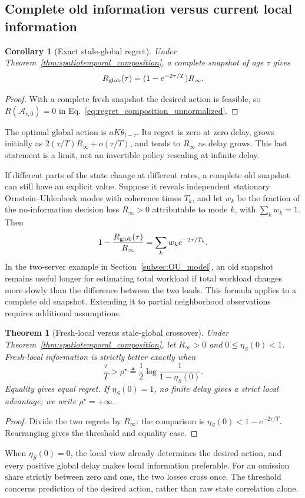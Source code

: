 \documentclass[11pt]{article}
\newtheorem{theorem}{Theorem}
\newtheorem{corollary}{Corollary}
\begin{document}
\subsection{Complete old information versus current local information}
\label{subsec:two_architectures}

\begin{corollary}[Exact stale-global regret]
\label{thm:OU_stale_regret}
Under Theorem~\ref{thm:spatiotemporal_composition}, a complete snapshot of age
$\tau$ gives
\begin{equation}
R_{\rm glob}(\tau)=(1-e^{-2\tau/T})R_\infty.
\label{eq:OU_exact_regret}
\end{equation}
\end{corollary}
\begin{proof}
With a complete fresh snapshot the desired action is feasible, so
$R(\mathcal A_{r,0})=0$ in Eq.~\eqref{eq:regret_composition_unnormalized}.
\end{proof}
The optimal global action is $aK\theta_{t-\tau}$. Its regret is zero at
zero delay, grows initially as $2(\tau/T)R_\infty+o(\tau/T)$, and tends to
$R_\infty$ as delay grows. This last statement is a limit, not an invertible
policy rescaling at infinite delay.

If different parts of the state change at different rates, a complete
old snapshot can still have an explicit value. Suppose it reveals
independent stationary Ornstein--Uhlenbeck modes with coherence times $T_k$,
and let $w_k$ be the fraction of the no-information decision loss
$R_\infty>0$ attributable to mode $k$, with $\sum_k w_k=1$. Then
\[
1-\frac{R_{\rm glob}(\tau)}{R_\infty}
=\sum_k w_k e^{-2\tau/T_k}.
\]
In the two-server example in Section~\ref{subsec:OU_model}, an old snapshot
remains useful longer for estimating total workload if total workload
changes more slowly than the difference between the two loads. This formula
applies to a complete old snapshot. Extending it to partial neighborhood
observations requires additional assumptions.

\begin{theorem}[Fresh-local versus stale-global crossover]
\label{thm:local_global_crossover}
Under Theorem~\ref{thm:spatiotemporal_composition}, let $R_\infty>0$ and
$0\le\eta_S(0)<1$. Fresh-local information is strictly better exactly when
\begin{equation}
\boxed{\frac{\tau}{T}>\rho^\star
\triangleq\frac12\log\frac{1}{1-\eta_S(0)}.}
\label{eq:OU_crossover}
\end{equation}
Equality gives equal regret. If $\eta_S(0)=1$, no finite delay gives a
strict local advantage; we write $\rho^\star=+\infty$.
\end{theorem}
\begin{proof}
Divide the two regrets by $R_\infty$: the comparison is
$\eta_S(0)<1-e^{-2\tau/T}$. Rearranging gives the threshold and equality case.
\end{proof}
When $\eta_S(0)=0$, the local view already determines the desired action,
and every positive global delay makes local information preferable.
For an omission share strictly between zero and one, the two losses cross
once. The threshold concerns prediction of the desired action, rather than
raw state correlation alone.
\end{document}
